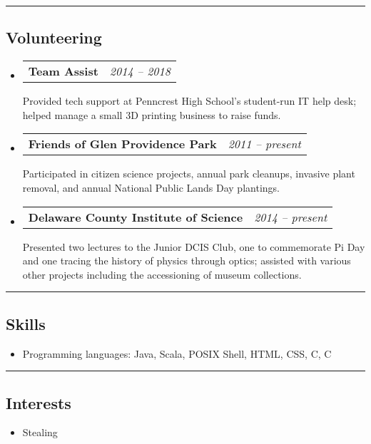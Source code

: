 \documentclass[11pt,letterpaper]{article}
\makeatletter
\newcommand{\headerrow}[2]
{\begin{tabular*}{\linewidth}{l@{\extracolsep{\fill}}r}
	#1 &
	#2 \\
\end{tabular*}}
\newcommand{\CPP}
{C\nolinebreak[4]\hspace{-.05em}\raisebox{.22ex}{\footnotesize\bf ++}}
\makeatother
\begin{document}
\hrule
\vspace{-0.4em}
\subsection*{Volunteering}

\begin{itemize}
	\parskip=0.1em

	\item
	\headerrow
		{\bfseries Team Assist}
		{\em 2014 -- 2018}
	Provided tech support at Penncrest High School's student-run IT help desk;
	helped manage a small 3D printing business to raise funds.

	\item
	\headerrow
		{\bfseries Friends of Glen Providence Park}
		{\em 2011 -- present}
	Participated in citizen science projects, annual park cleanups, invasive plant removal,
	and annual National Public Lands Day plantings.

	\item
	\headerrow
		{\bfseries Delaware County Institute of Science}
		{\em 2014 -- present}
	Presented two lectures to the Junior DCIS Club, one to commemorate Pi Day and one tracing the history of physics through optics; assisted with various other projects including the accessioning of museum collections.

\end{itemize}

\hrule
\vspace{-0.4em}
\subsection*{Skills}

\begin{itemize}

	\item[]
	Programming languages: Java, Scala, POSIX Shell, HTML, CSS, C, \CPP{}

\end{itemize}

\hrule
\vspace{-0.4em}
\subsection*{Interests}

\begin{itemize}

	\item[]
	Stealing

\end{itemize}
\end{document}
